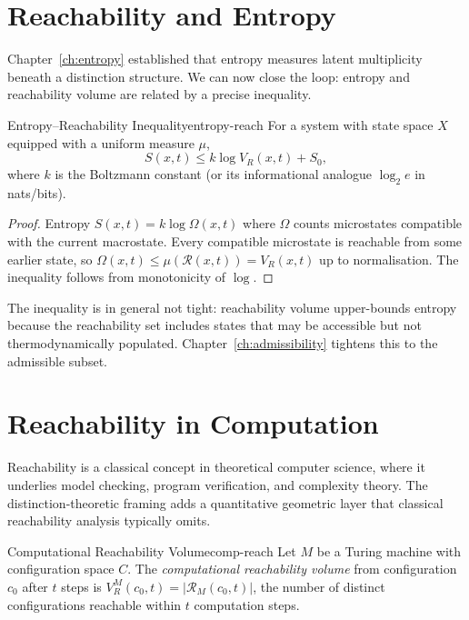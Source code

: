 \documentclass[12pt,twoside,openright]{book}
\newcommand{\csicon} {\marginpar{\tiny\color{DistBlue}\faCode}}
\newcommand{\reach}{\mathcal{R}}
\begin{document}
\section{Reachability and Entropy}
\label{sec:ch13-entropy}

Chapter~\ref{ch:entropy} established that entropy measures
latent multiplicity beneath a distinction structure. We can
now close the loop: entropy and reachability volume are
related by a precise inequality.

\begin{theorem}{Entropy--Reachability Inequality}{entropy-reach}
  For a system with state space $X$ equipped with a
  uniform measure $\mu$,
  \[
    S(x,t) \le k\log V_R(x,t) + S_0,
  \]
  where $k$ is the Boltzmann constant (or its informational
  analogue $\log_2 e$ in nats/bits).
\end{theorem}

\begin{proof}
  Entropy $S(x,t)=k\log\Omega(x,t)$ where $\Omega$ counts
  microstates compatible with the current macrostate. Every
  compatible microstate is reachable from some earlier
  state, so $\Omega(x,t)\le\mu(\reach(x,t))=V_R(x,t)$ up to
  normalisation. The inequality follows from monotonicity
  of $\log$.
\end{proof}

The inequality is in general not tight: reachability volume
upper-bounds entropy because the reachability set includes
states that may be accessible but not thermodynamically
populated. Chapter~\ref{ch:admissibility} tightens this to
the admissible subset.

\section{Reachability in Computation}
\label{sec:ch13-computation}

\csicon
Reachability is a classical concept in theoretical computer
science, where it underlies model checking, program
verification, and complexity theory. The
distinction-theoretic framing adds a quantitative geometric
layer that classical reachability analysis typically omits.

\begin{definition}{Computational Reachability Volume}{comp-reach}
  Let $M$ be a Turing machine with configuration space $C$.
  The \emph{computational reachability volume} from
  configuration $c_0$ after $t$ steps is
  $V_R^M(c_0,t) = |\reach_M(c_0,t)|$, the number of
  distinct configurations reachable within $t$ computation
  steps.
\end{definition}
\end{document}
